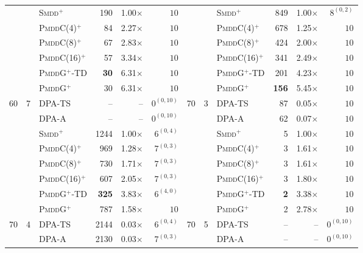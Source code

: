\documentclass[letterpaper]{article}
\begin{document}
\begin{table}[t]
{\begin{tabular}{rrlrrrrrlrrr}
 &  & \textsc{Smdd}$^+$ & 190 & 1.00$\times$ & $10$ &  &  & \textsc{Smdd}$^+$ & 849 & 1.00$\times$ & $8^{(0, 2)}$ \\
 &  & \textsc{PmddC}(4)$^+$ & 84 & 2.27$\times$ & $10$ &  &  & \textsc{PmddC}(4)$^+$ & 678 & 1.25$\times$ & $10$ \\
 &  & \textsc{PmddC}(8)$^+$ & 67 & 2.83$\times$ & $10$ &  &  & \textsc{PmddC}(8)$^+$ & 424 & 2.00$\times$ & $10$ \\
 &  & \textsc{PmddC}(16)$^+$ & 57 & 3.34$\times$ & $10$ &  &  & \textsc{PmddC}(16)$^+$ & 341 & 2.49$\times$ & $10$ \\
 &  & \textsc{PmddG$^+$-TD} & \textbf{30} & 6.31$\times$ & $10$ &  &  & \textsc{PmddG$^+$-TD} & 201 & 4.23$\times$ & $10$ \\
 &  & \textsc{PmddG}$^+$ & 30 & 6.31$\times$ & $10$ &  &  & \textsc{PmddG}$^+$ & \textbf{156} & 5.45$\times$ & $10$ \\
\midrule
\multirow{8}{*}{60} & \multirow{8}{*}{7} & DPA-TS & -- & -- & $0^{(0, 10)}$ & \multirow{8}{*}{70} & \multirow{8}{*}{3} & DPA-TS & 87 & 0.05$\times$ & $10$ \\
 &  & DPA-A & -- & -- & $0^{(0, 10)}$ &  &  & DPA-A & 62 & 0.07$\times$ & $10$ \\
 &  & \textsc{Smdd}$^+$ & 1244 & 1.00$\times$ & $6^{(0, 4)}$ &  &  & \textsc{Smdd}$^+$ & 5 & 1.00$\times$ & $10$ \\
 &  & \textsc{PmddC}(4)$^+$ & 969 & 1.28$\times$ & $7^{(0, 3)}$ &  &  & \textsc{PmddC}(4)$^+$ & 3 & 1.61$\times$ & $10$ \\
 &  & \textsc{PmddC}(8)$^+$ & 730 & 1.71$\times$ & $7^{(0, 3)}$ &  &  & \textsc{PmddC}(8)$^+$ & 3 & 1.61$\times$ & $10$ \\
 &  & \textsc{PmddC}(16)$^+$ & 607 & 2.05$\times$ & $7^{(0, 3)}$ &  &  & \textsc{PmddC}(16)$^+$ & 3 & 1.80$\times$ & $10$ \\
 &  & \textsc{PmddG$^+$-TD} & \textbf{325} & 3.83$\times$ & $6^{(4, 0)}$ &  &  & \textsc{PmddG$^+$-TD} & \textbf{2} & 3.38$\times$ & $10$ \\
 &  & \textsc{PmddG}$^+$ & 787 & 1.58$\times$ & $10$ &  &  & \textsc{PmddG}$^+$ & 2 & 2.78$\times$ & $10$ \\
\midrule
\multirow{8}{*}{70} & \multirow{8}{*}{4} & DPA-TS & 2144 & 0.03$\times$ & $6^{(0, 4)}$ & \multirow{8}{*}{70} & \multirow{8}{*}{5} & DPA-TS & -- & -- & $0^{(0, 10)}$ \\
 &  & DPA-A & 2130 & 0.03$\times$ & $7^{(0, 3)}$ &  &  & DPA-A & -- & -- & $0^{(0, 10)}$ \\

\end{tabular}}
\end{table}
\end{document}
